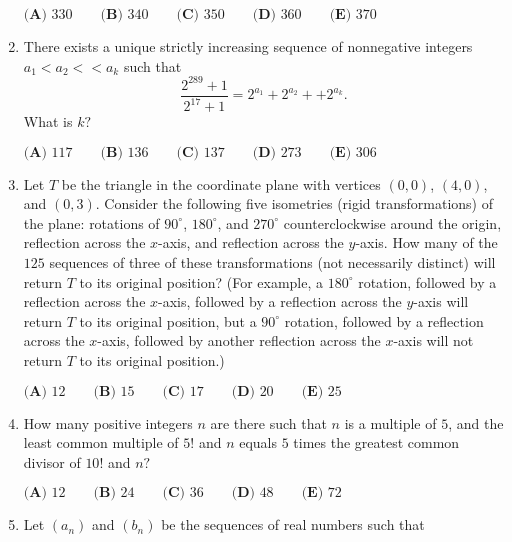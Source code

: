 \documentclass{article}
\begin{document}
\begin{enumerate}[label=\arabic*., itemsep=0.5em]
\(\textbf{(A) } 330 \qquad\textbf{(B) } 340 \qquad\textbf{(C) } 350 \qquad\textbf{(D) } 360 \qquad\textbf{(E) } 370\)\par \vspace{0.5em}\item There exists a unique strictly increasing sequence of nonnegative integers \(a_1 < a_2 <  < a_k\) such that
\begin{equation*}
\frac{2^{289}+1}{2^{17}+1} = 2^{a_1} + 2^{a_2} +  + 2^{a_k}.
\end{equation*}
What is \(k?\)

\(\textbf{(A) } 117 \qquad \textbf{(B) } 136 \qquad \textbf{(C) } 137 \qquad \textbf{(D) } 273 \qquad \textbf{(E) } 306\)\par \vspace{0.5em}\item Let \(T\) be the triangle in the coordinate plane with vertices \(\left(0,0\right)\), \(\left(4,0\right)\), and \(\left(0,3\right)\). Consider the following five isometries (rigid transformations) of the plane: rotations of \(90^{\circ}\), \(180^{\circ}\), and \(270^{\circ}\) counterclockwise around the origin, reflection across the \(x\)-axis, and reflection across the \(y\)-axis. How many of the \(125\) sequences of three of these transformations (not necessarily distinct) will return \(T\) to its original position? (For example, a \(180^{\circ}\) rotation, followed by a reflection across the \(x\)-axis, followed by a reflection across the \(y\)-axis will return \(T\) to its original position, but a \(90^{\circ}\) rotation, followed by a reflection across the \(x\)-axis, followed by another reflection across the \(x\)-axis will not return \(T\) to its original position.)

\(\textbf{(A) } 12\qquad\textbf{(B) } 15\qquad\textbf{(C) }17 \qquad\textbf{(D) }20 \qquad\textbf{(E) }25\)\par \vspace{0.5em}\item How many positive integers \(n\) are there such that \(n\) is a multiple of \(5\), and the least common multiple of \(5!\) and \(n\) equals \(5\) times the greatest common divisor of \(10!\) and \(n?\)

\(\textbf{(A) } 12 \qquad \textbf{(B) } 24 \qquad \textbf{(C) } 36 \qquad \textbf{(D) } 48 \qquad \textbf{(E) } 72\)\par \vspace{0.5em}\item Let \((a_n)\) and \((b_n)\) be the sequences of real numbers such that


\end{enumerate}
\end{document}
